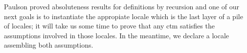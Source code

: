 Paulson proved absoluteness results for definitions by recursion and
one of our next goals is to instantiate the appropiate locale
 which is the last layer of a pile of
locales; it will take us some time to prove that any ctm satisfies the
assumptions involved in those locales. In the meantime, we declare a
locale 
assembling both assumptions.

